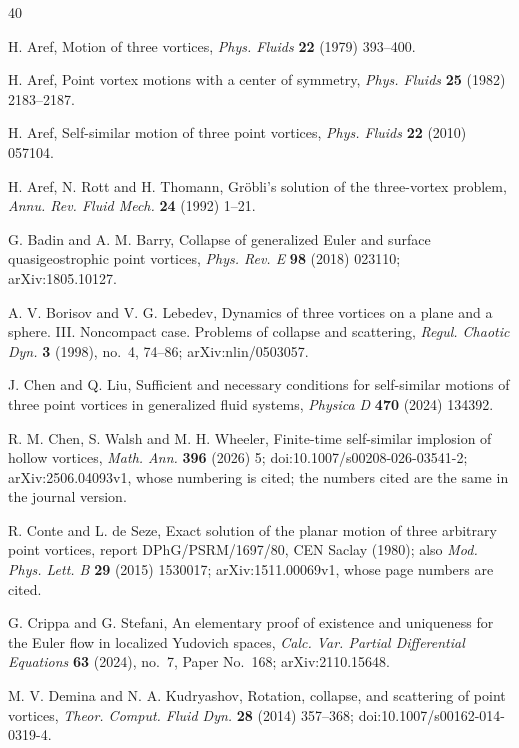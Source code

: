 \documentclass[11pt]{article}
\theoremstyle{definition}
\begin{document}
\begin{thebibliography}{40}
\small

 H. Aref, Motion of three vortices, \emph{Phys. Fluids} \textbf{22} (1979) 393--400.

 H. Aref, Point vortex motions with a center of symmetry, \emph{Phys. Fluids} \textbf{25} (1982) 2183--2187.

 H. Aref, Self-similar motion of three point vortices, \emph{Phys. Fluids} \textbf{22} (2010) 057104.

 H. Aref, N. Rott and H. Thomann, Gr\"obli's solution of the three-vortex problem, \emph{Annu. Rev. Fluid Mech.} \textbf{24} (1992) 1--21.

 G. Badin and A. M. Barry, Collapse of generalized Euler and surface quasigeostrophic point vortices, \emph{Phys. Rev. E} \textbf{98} (2018) 023110; arXiv:1805.10127.

 A. V. Borisov and V. G. Lebedev, Dynamics of three vortices on a plane and a sphere. III. Noncompact case. Problems of collapse and scattering, \emph{Regul. Chaotic Dyn.} \textbf{3} (1998), no.~4, 74--86; arXiv:nlin/0503057.

 J. Chen and Q. Liu, Sufficient and necessary conditions for self-similar motions of three point vortices in generalized fluid systems, \emph{Physica D} \textbf{470} (2024) 134392.

 R. M. Chen, S. Walsh and M. H. Wheeler, Finite-time self-similar implosion of hollow vortices, \emph{Math. Ann.} \textbf{396} (2026) 5; doi:10.1007/s00208-026-03541-2; arXiv:2506.04093v1, whose numbering is cited; the numbers cited are the same in the journal version.

 R. Conte and L. de Seze, Exact solution of the planar motion of three arbitrary point vortices, report DPhG/PSRM/1697/80, CEN Saclay (1980); also \emph{Mod. Phys. Lett. B} \textbf{29} (2015) 1530017; arXiv:1511.00069v1, whose page numbers are cited.

 G. Crippa and G. Stefani, An elementary proof of existence and uniqueness for the Euler flow in localized Yudovich spaces, \emph{Calc. Var. Partial Differential Equations} \textbf{63} (2024), no.~7, Paper No.~168; arXiv:2110.15648.

 M. V. Demina and N. A. Kudryashov, Rotation, collapse, and scattering of point vortices, \emph{Theor. Comput. Fluid Dyn.} \textbf{28} (2014) 357--368; doi:10.1007/s00162-014-0319-4.


\end{thebibliography}
\end{document}
